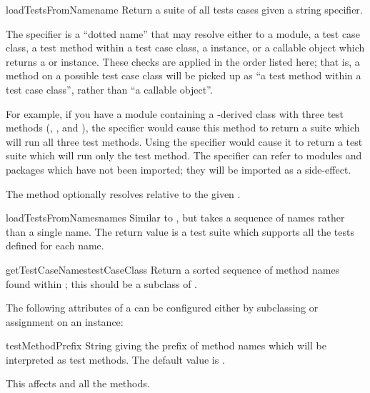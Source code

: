 \begin{methoddesc}[TestLoader]{loadTestsFromName}{name}
  Return a suite of all tests cases given a string specifier.

  The specifier  is a ``dotted name'' that may resolve
  either to a module, a test case class, a test method within a test
  case class, a  instance, or a callable object which
  returns a  or  instance.  These checks
  are applied in the order listed here; that is, a method on a possible
  test case class will be picked up as ``a test method within a test
  case class'', rather than ``a callable object''.

  For example, if you have a module  containing a
  -derived class  with three test
  methods (, , and
  ), the specifier 
  would cause this method to return a suite which will run all three test
  methods.  Using the specifier 
  would cause it to return a test suite which will run only the
   test method.  The specifier can refer to modules
  and packages which have not been imported; they will be imported as
  a side-effect.

  The method optionally resolves  relative to the given
  .
\end{methoddesc}

\begin{methoddesc}[TestLoader]{loadTestsFromNames}{names}
  Similar to , but takes a sequence of
  names rather than a single name.  The return value is a test suite
  which supports all the tests defined for each name.
\end{methoddesc}

\begin{methoddesc}[TestLoader]{getTestCaseNames}{testCaseClass}
  Return a sorted sequence of method names found within
  ; this should be a subclass of .
\end{methoddesc}


The following attributes of a  can be configured
either by subclassing or assignment on an instance:

\begin{memberdesc}[TestLoader]{testMethodPrefix}
  String giving the prefix of method names which will be interpreted
  as test methods.  The default value is .
  
  This affects  and all the
   methods.
\end{memberdesc}

